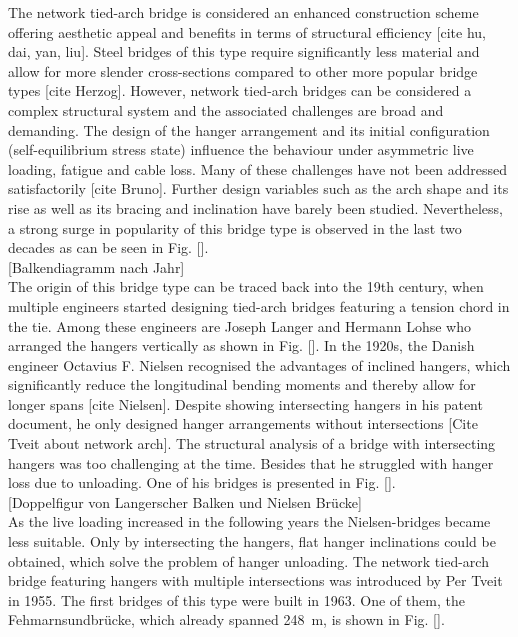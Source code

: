 The network tied-arch bridge is considered an enhanced construction scheme offering aesthetic appeal and benefits in terms of structural efficiency [cite hu, dai, yan, liu]. Steel bridges of this type require significantly less material and allow for more slender cross-sections compared to other more popular bridge types [cite Herzog]. However, network tied-arch bridges can be considered a complex structural system and the associated challenges are broad and demanding. The design of the hanger arrangement and its initial configuration (self-equilibrium stress state) influence the behaviour under asymmetric live loading, fatigue and cable loss. Many of these challenges have not been addressed satisfactorily [cite Bruno]. Further design variables such as the arch shape and its rise as well as its bracing and inclination have barely been studied. Nevertheless, a strong surge in popularity of this bridge type is observed in the last two decades as can be seen in Fig. [].\\

[Balkendiagramm nach Jahr]\\

The origin of this bridge type can be traced back into the 19th century, when multiple engineers started designing tied-arch bridges featuring a tension chord in the tie. Among these engineers are Joseph Langer and Hermann Lohse who arranged the hangers vertically as shown in Fig. []. In the 1920s, the Danish engineer Octavius F. Nielsen recognised the advantages of inclined hangers, which significantly reduce the longitudinal bending moments and thereby allow for longer spans [cite Nielsen]. Despite showing intersecting hangers in his patent document, he only designed hanger arrangements without intersections [Cite Tveit about network arch]. The structural analysis of a bridge with intersecting hangers was too challenging at the time. Besides that he struggled with hanger loss due to unloading. One of his bridges is presented in Fig. []. \\

[Doppelfigur von Langerscher Balken und Nielsen Brücke]\\

As the live loading increased in the following years the Nielsen-bridges became less suitable. Only by intersecting the hangers, flat hanger inclinations could be obtained, which solve the problem of hanger unloading. The network tied-arch bridge featuring hangers with multiple intersections was introduced by Per Tveit in 1955. The first bridges of this type were built in 1963. One of them, the Fehmarnsundbrücke, which already spanned \SI{248}{m}, is shown in Fig. []. \\

